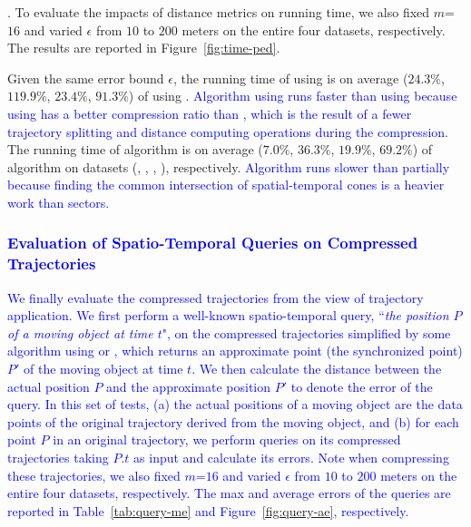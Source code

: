 {.
To evaluate the impacts of distance metrics on running time, we also fixed {$m$=$16$} and varied $\epsilon$ from $10$ to $200$ meters on the entire four datasets, respectively.
The results are reported in Figure~\ref{fig:time-ped}.

Given the same error bound $\epsilon$, the running time of \dpa  using \ped is on average
($24.3\%$, $119.9\%$, $23.4\%$, $91.3\%$) of \dpa  using \sed.
\textcolor{blue}{Algorithm \dpa using \ped runs faster than using \sed because \dpa using \ped has a better compression ratio than \sed, which is the result of a fewer trajectory splitting and distance computing operations during the compression.}
%
The running time of algorithm  is on average ($7.0\%$, $36.3\%$, $19.9\%$, $69.2\%$)
of algorithm \cist on datasets (\sercar, \geolife, \mopsi, \pricar), respectively.
\textcolor{blue}{Algorithm \cist runs slower than  partially because
finding the common intersection of spatial-temporal cones is a heavier work than sectors.
}


\subsubsection{\textcolor{blue}{Evaluation of Spatio-Temporal Queries on Compressed Trajectories}}
\textcolor{blue}{We finally evaluate the compressed trajectories from the view of trajectory application.}
\textcolor{blue}{We first perform a well-known spatio-temporal query, \ie ``\emph{the position $P$ of a moving object at time $t$}", on the compressed trajectories simplified by some \lsa algorithm using \ped or \sed, which returns an approximate point (\ie the synchronized point) $P'$ of the moving object at time $t$.
We then calculate the distance between the actual position $P$ and the approximate position $P'$ to denote the error of the query.}
\textcolor{blue}{In this set of tests, (a) the actual positions of a moving object are the data points of the original trajectory derived from the moving object, and (b) for each point $P$ in an original trajectory, we perform queries on its compressed trajectories taking $P.t$ as input and calculate its errors. Note when compressing these trajectories, we also fixed {$m$=$16$} and varied $\epsilon$ from $10$ to $200$ meters on the entire four datasets, respectively.}
\textcolor{blue}{The max and average errors of the queries are reported in Table~\ref{tab:query-me} and Figure~\ref{fig:query-ae}, respectively.}

}
